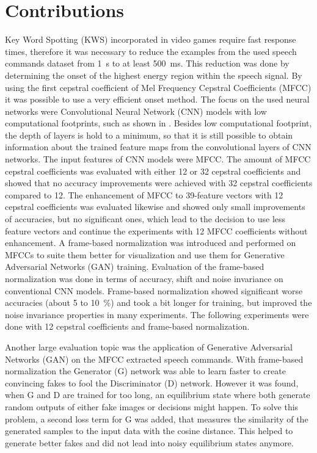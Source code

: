 
\section{Contributions}
\thesisStateNew
Key Word Spotting (KWS) incorporated in video games require fast response times, therefore it was necessary to reduce the examples from the used speech commands dataset \cite{Warden2018} from \SI{1}{\second} to at least \SI{500}{\milli\second}.
This reduction was done by determining the onset of the highest energy region within the speech signal.
By using the first cepstral coefficient of Mel Frequency Cepstral Coefficients (MFCC) it was possible to use a very efficient onset method.
The focus on the used neural networks were Convolutional Neural Network (CNN) models with low computational footprints, such as shown in \cite{Sainath2015}.
Besides low computational footprint, the depth of layers is hold to a minimum, so that it is still possible to obtain information about the trained feature maps from the convolutional layers of CNN networks.
The input features of CNN models were MFCC.
The amount of MFCC cepstral coefficients was evaluated with either 12 or 32 cepstral coefficients and showed that no accuracy improvements were achieved with 32 cepstral coefficients compared to 12.
The enhancement of MFCC to 39-feature vectors with 12 cepstral coefficients was evaluated likewise and showed only small improvements of accuracies, but no significant ones, which lead to the decision to use less feature vectors and continue the experiments with 12 MFCC coefficients without enhancement.
A frame-based normalization was introduced and performed on MFCCs to suite them better for visualization and use them for Generative Adversarial Networks (GAN) training.
Evaluation of the frame-based normalization was done in terms of accuracy, shift and noise invariance on conventional CNN models.
Frame-based normalization showed significant worse accuracies (about 5 to \SI{10}{\percent}) and took a bit longer for training, but improved the noise invariance properties in many experiments.
The following experiments were done with 12 cepstral coefficients and frame-based normalization.

Another large evaluation topic was the application of Generative Adversarial Networks (GAN) on the MFCC extracted speech commands. 
With frame-based normalization the Generator (G) network was able to learn faster to create convincing fakes to fool the Discriminator (D) network.
However it was found, when G and D are trained for too long, an equilibrium state where both generate random outputs of either fake images or decisions might happen.
To solve this problem, a second loss term for G was added, that measures the similarity of the generated samples to the input data with the cosine distance.
This helped to generate better fakes and did not lead into noisy equilibrium states anymore.

